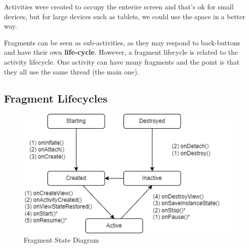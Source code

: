 Activities were created to occupy the enterire screen and that's 
ok for small devices, but for large devices such as tablets,
we could use the space in a better way. 

Fragments can be seen as sub-activities, as they may respond to back-buttons 
and have their own \textbf{life-cycle}. However, a fragment lifecycle is 
related to the activity lifecycle. 
One activity can have many fragments and the point is that they all use the same 
thread (the main one).

\subsection{Fragment Lifecycles}

\begin{figure}[h]
\centering
\includegraphics[width=0.8\linewidth]{figures/03_fragment_state_diagram.png}
\caption{Fragment State Diagram}
\label{fig:fragment_state_diagram}
\end{figure}


